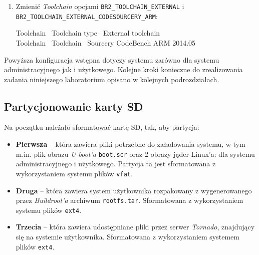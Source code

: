 \documentclass{article}
\newenvironment{ttblock}{\ttfamily}{\par}
\begin{document}
\begin{enumerate}
\item Zmienić \emph{Toolchain} opcjami \texttt{BR2\_TOOLCHAIN\_EXTERNAL} i\\ \texttt{BR2\_TOOLCHAIN\_EXTERNAL\_CODESOURCERY\_ARM}:

\begin{ttblock}
Toolchain \textrightarrow\ Toolchain type \textrightarrow\ External toolchain\\
Toolchain \textrightarrow\ Toolchain \textrightarrow\ Sourcery CodeBench ARM 2014.05
\end{ttblock}

%
\end{enumerate}

Powyższa konfiguracja wstępna dotyczy systemu zarówno dla systemu administracyjnego jak i użytkowego. Kolejne kroki konieczne do zrealizowania zadania niniejszego laboratorium opisano w kolejnych podrozdziałach.


\subsection{Partycjonowanie karty SD}
\label{partitions}

Na początku należało sformatować kartę SD, tak, aby partycja:
\begin{itemize}
	\item \textbf{Pierwsza} -- która zawiera pliki potrzebne do załadowania systemu, w tym m.in. plik obrazu \emph{U-boot'a} \texttt{boot.scr} oraz 2 obrazy jąder Linux'a: dla systemu administracyjnego i użytkowego. Partycja ta jest sformatowana z wykorzystaniem systemu plików \texttt{vfat}.
	\item \textbf{Druga} -- która zawiera system użytkownika rozpakowany z wygenerowanego przez \emph{Buildroot'a} archiwum \texttt{rootfs.tar}. Sformatowana z wykorzystaniem systemu plików \texttt{ext4}.
	\item \textbf{Trzecia} -- która zawiera udostępniane pliki przez serwer \emph{Tornado}, znajdujący się na systemie użytkownika. Sformatowana z wykorzystaniem systemem plików \texttt{ext4}.
\end{itemize}
\end{document}
